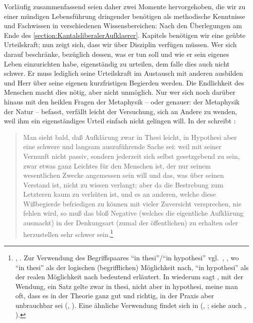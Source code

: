 Vorläufig zusammenfassend seien daher zwei Momente hervorgehoben, die wir zu
einer mündigen Lebensführung dringender benötigen als methodische Kenntnisse und
Fachwissen in verschiedenen Wissensbereichen: Nach den Überlegungen am Ende des
\ref{section:KantalsliberalerAufklaerer}. Kapitels benötigen wir eine geübte
Urteilskraft; nun zeigt sich, dass wir über Disziplin verfügen müssen.
Wer sich darauf beschränke, bezüglich dessen, was er tun soll und wie er sein eigenes Leben
einzurichten habe, eigenständig zu urteilen, dem falle dies auch nicht schwer.
Er muss lediglich seine Urteilskraft im Austausch mit anderen ausbilden und
Herr über seine eigenen kurzfristigen Begierden werden. Die Endlichkeit des
Menschen macht dies nötig, aber nicht unmöglich. Nur wer sich noch darüber
hinaus mit den heiklen Fragen der Metaphysik -- oder genauer: der Metaphysik der
Natur -- befasst, verfällt leicht der Versuchung, sich an Andere zu wenden, weil
ihm ein eigenständiges Urteil einfach nicht gelingen will. In der  schreibt :
\begin{quote}
  Man sieht bald, daß Aufklärung zwar in Thesi leicht, in Hypothesi aber eine
  schwere und langsam auszuführende Sache sei: weil mit seiner Vernunft nicht
  passiv, sondern jederzeit sich selbst gesetzgebend zu sein, zwar etwas ganz
  Leichtes für den Menschen ist, der nur seinem wesentlichen Zwecke angemessen
  sein will und das, was über seinen Verstand ist, nicht zu wissen verlangt;
  aber da die Bestrebung zum Letzteren kaum zu verhüten ist, und es an anderen,
  welche diese Wißbegierde befriedigen zu können mit vieler Zuversicht
  versprechen, nie fehlen wird, so muß das bloß Negative (welches die
  eigentliche Aufklärung ausmacht) in der Denkungsart (zumal der öffentlichen)
  zu erhalten oder herzustellen sehr schwer
  sein.\footnote{\cite[][\S~40]{Kant:KritikderUrteilskraft2009}, \cite[][V:
  294.29--37]{Kant:GesammelteWerke1900ff.}.  Zur Verwendung des Begriffspaares
  \enquote{in thesi}/\enquote{in hypothesi} vgl.\
  \cite[][]{Kant:Reflexionen1900ff.}, \cite[][XVIII:
  329.1--2]{Kant:GesammelteWerke1900ff.}, wo  \enquote{in
  thesi} als der logischen (begrifflichen) Möglichkeit nach, \enquote{in hypothesi} als der realen
  Möglichkeit nach bedeutend erläutert. In \titel{Über den Gemeinspruch\ldots}
  wiederum sagt \name[Immanuel]{Kant}, mit der Wendung, ein Satz gelte zwar in
  thesi, nicht aber in hypothesi, meine man oft, dass es in der Theorie ganz
  gut und richtig, in der Praxis aber unbrauchbar sei
  \mkbibparens{\cite[vgl.][A
  204]{Kant:UeberdenGemeinspruch:dasmaginderTheorierichtigseintaugtabernichtfuerdiePraxis1977},
  \cite[][VIII: 276.9--18]{Kant:GesammelteWerke1900ff.}}. Eine ähnliche
  Verwendung findet sich in \titel{Zum ewigen Frieden}
  \mkbibparens{\cite[vgl.][BA 38]{Kant:ZumewigenFrieden1900ff.},
  \cite[][VIII: 357.12--13]{Kant:GesammelteWerke1900ff.}; siehe auch
  \cite[][B 22]{Kant:DieReligioninnerhalbderGrenzenderblossenVernunft1977},
  \cite[][VI: 29.24--30]{Kant:GesammelteWerke1900ff.}}.}
\end{quote}

